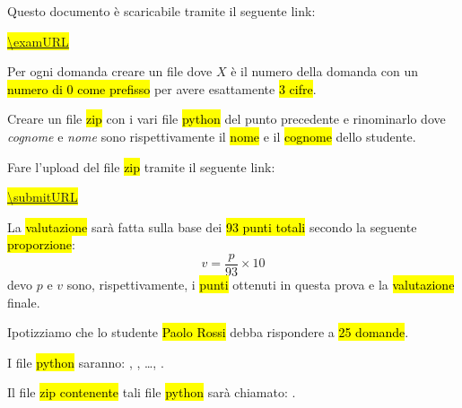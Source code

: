 \documentclass[a4paper,11pt,addpoints]{exam}
\begin{document}
\addheader

\begin{important}
    \item Questo documento è scaricabile tramite il seguente link:
    \begin{center}
        \small
        \hl{\url{\examURL}}\\[5mm]
        \qrcode[hyperlink,height=2cm]{\examURL}
    \end{center}
    \item Per ogni domanda creare un file  dove \emph{$X$} è il numero della domanda
    con un \hl{numero di \num{0} come prefisso}
    per avere esattamente \hl{\num{3} cifre}.
    \item Creare un file \hl{zip} con i vari file \hl{python} del punto precedente e
    rinominarlo  dove \emph{cognome} e \emph{nome} sono
    rispettivamente il \hl{nome} e il \hl{cognome} dello studente.
    \item Fare l'upload del file \hl{zip} tramite il seguente link:
    \begin{center}
        \small
        \hl{\url{\submitURL}}\\[5mm]
        \qrcode[hyperlink,height=2cm]{\submitURL}
    \end{center}
\end{important}

\begin{notes}
    \item La \hl{valutazione} sarà fatta sulla base dei \hl{\num{93} punti totali}
    secondo la seguente \hl{proporzione}:
    \begin{equation*}
        v = \frac{p}{93} \times 10
    \end{equation*}
    devo $p$ e $v$ sono, rispettivamente, i \hl{punti} ottenuti in questa prova e la \hl{valutazione} finale.
\end{notes}

\begin{examples}
    \item Ipotizziamo che lo studente \hl{Paolo Rossi} debba rispondere a \hl{\num{25} domande}.
    \item I file \hl{python} saranno: , , \dots, .
    \item Il file \hl{zip contenente} tali file \hl{python} sarà chiamato: .
\end{examples}
\end{document}
